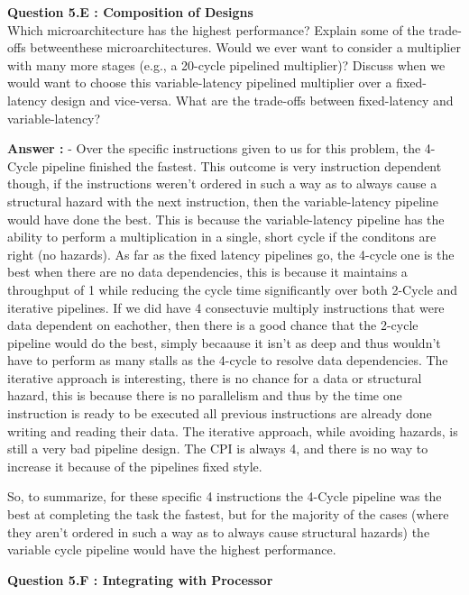 \documentclass[a4paper,11pt]{article}
\newcommand{\answer}{\textbf{Answer : }}
\begin{document}
\item \textbf{Question 5.E : Composition of Designs} \\
  Which microarchitecture has the highest performance? Explain some of the trade-offs betweenthese microarchitectures. Would we ever want to consider a multiplier with many more stages (e.g., a 20-cycle pipelined multiplier)? Discuss when we would want to choose this variable-latency pipelined multiplier over a fixed-latency design and vice-versa. What are the trade-offs between fixed-latency and variable-latency?

  \answer - Over the specific instructions given to us for this problem, the 4-Cycle pipeline finished the fastest. This outcome is very instruction dependent though, if the instructions weren't ordered in such a way as to always cause a structural hazard with the next instruction, then the variable-latency pipeline would have done the best. This is because the variable-latency pipeline has the ability to perform a multiplication in a single, short cycle if the conditons are right (no hazards). As far as the fixed latency pipelines go, the 4-cycle one is the best when there are no data dependencies, this is because it maintains a throughput of 1 while reducing the cycle time significantly over both 2-Cycle and iterative pipelines. If we did have 4 consectuvie multiply instructions that were data dependent on eachother, then there is a good chance that the 2-cycle pipeline would do the best, simply becaause it isn't as deep and thus wouldn't have to perform as many stalls as the 4-cycle to resolve data dependencies. The iterative approach is interesting, there is no chance for a data or structural hazard, this is because there is no parallelism and thus by the time one instruction is ready to be executed all previous instructions are already done writing and reading their data. The iterative approach, while avoiding hazards, is still a very bad pipeline design. The CPI is always 4, and there is no way to increase it because of the pipelines fixed style. 

So, to summarize, for these specific 4 instructions the 4-Cycle pipeline was the best at completing the task the fastest, but for the majority of the cases (where they aren't ordered in such a way as to always cause structural hazards) the variable cycle pipeline would have the highest performance. \\

\item \textbf{Question 5.F : Integrating with Processor} \\
\end{document}

